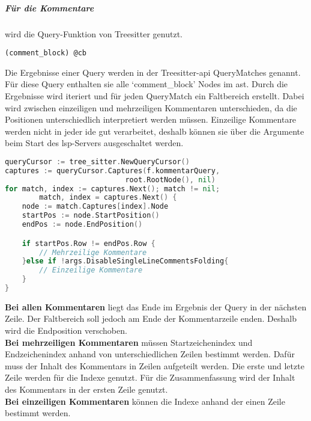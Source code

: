 \documentclass[./einleitung.tex]{subfiles}
\begin{document}
    \subparagraph{Für die Kommentare} wird die Query-Funktion von Treesitter genutzt.
    \begin{lstlisting}[capture=Die Query für alle Kommentare, label=lst:commentQuery]
(comment_block) @cb
    \end{lstlisting}
    Die Ergebnisse einer Query werden in der Treesitter-\acrshort{api} QueryMatches genannt.
    Für diese Query enthalten sie alle `comment_block' Nodes im \acrshort{ast}.
    Durch die Ergebnisse wird iteriert und für jeden QueryMatch ein Faltbereich erstellt.
    Dabei wird zwischen einzeiligen und mehrzeiligen Kommentaren unterschieden, da die Positionen unterschiedlich interpretiert werden müssen.
    Einzeilige Kommentare werden nicht in jeder \acrshort{ide} gut verarbeitet, deshalb können sie über die Argumente beim Start des \acrshort{lsp}-Servers ausgeschaltet werden.
    \begin{lstlisting}[language=Go, caption=Auszug aus der Bestimmung der Faltbereiche für die Kommentare, label=lst:foldingCommentsFor]
queryCursor := tree_sitter.NewQueryCursor()
captures := queryCursor.Captures(f.kommentarQuery,
                            root.RootNode(), nil)
for match, index := captures.Next(); match != nil;
        match, index = captures.Next() {
    node := match.Captures[index].Node
    startPos := node.StartPosition()
    endPos := node.EndPosition()

    if startPos.Row != endPos.Row {
        // Mehrzeilige Kommentare
    }else if !args.DisableSingleLineCommentsFolding{
        // Einzeilige Kommentare
    }
}
    \end{lstlisting}
    \textbf{Bei allen Kommentaren} liegt das Ende im Ergebnis der Query in der nächsten Zeile.
    Der Faltbereich soll jedoch am Ende der Kommentarzeile enden.
    Deshalb wird die Endposition verschoben.\\
    \textbf{Bei mehrzeiligen Kommentaren} müssen Startzeichenindex und Endzeichenindex anhand von unterschiedlichen Zeilen bestimmt werden.
    Dafür muss der Inhalt des Kommentars in Zeilen aufgeteilt werden.
    Die erste und letzte Zeile werden für die Indexe genutzt.
    Für die Zusammenfassung wird der Inhalt des Kommentars in der ersten Zeile genutzt.\\
    \textbf{Bei einzeiligen Kommentaren} können die Indexe anhand der einen Zeile bestimmt werden.
\end{document}

